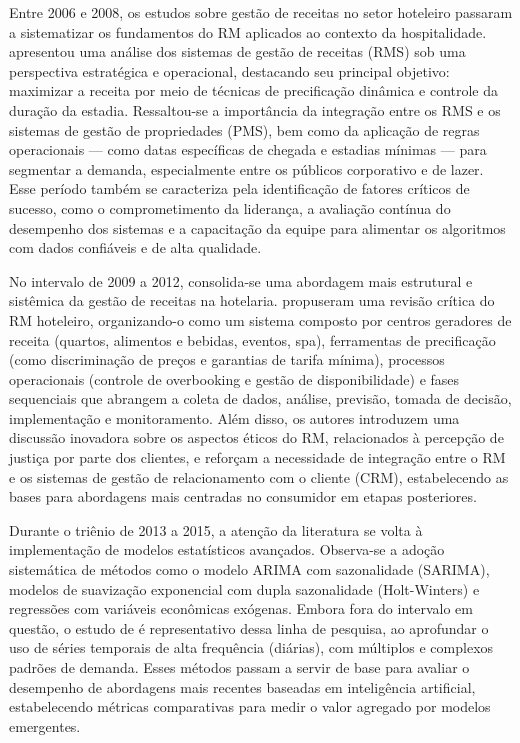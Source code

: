 Entre 2006 e 2008, os estudos sobre gestão de receitas no setor hoteleiro passaram a sistematizar os fundamentos do RM aplicados ao contexto da hospitalidade. \citep{Avinal15022006} apresentou uma análise dos sistemas de gestão de receitas (RMS) sob uma perspectiva estratégica e operacional, destacando seu principal objetivo: maximizar a receita por meio de técnicas de precificação dinâmica e controle da duração da estadia. Ressaltou-se a importância da integração entre os RMS e os sistemas de gestão de propriedades (PMS), bem como da aplicação de regras operacionais — como datas específicas de chegada e estadias mínimas — para segmentar a demanda, especialmente entre os públicos corporativo e de lazer. Esse período também se caracteriza pela identificação de fatores críticos de sucesso, como o comprometimento da liderança, a avaliação contínua do desempenho dos sistemas e a capacitação da equipe para alimentar os algoritmos com dados confiáveis e de alta qualidade.

No intervalo de 2009 a 2012, consolida-se uma abordagem mais estrutural e sistêmica da gestão de receitas na hotelaria. \citep{Ivanov2011} propuseram uma revisão crítica do RM hoteleiro, organizando-o como um sistema composto por centros geradores de receita (quartos, alimentos e bebidas, eventos, spa), ferramentas de precificação (como discriminação de preços e garantias de tarifa mínima), processos operacionais (controle de overbooking e gestão de disponibilidade) e fases sequenciais que abrangem a coleta de dados, análise, previsão, tomada de decisão, implementação e monitoramento. Além disso, os autores introduzem uma discussão inovadora sobre os aspectos éticos do RM, relacionados à percepção de justiça por parte dos clientes, e reforçam a necessidade de integração entre o RM e os sistemas de gestão de relacionamento com o cliente (CRM), estabelecendo as bases para abordagens mais centradas no consumidor em etapas posteriores.

Durante o triênio de 2013 a 2015, a atenção da literatura se volta à implementação de modelos estatísticos avançados. Observa-se a adoção sistemática de métodos como o modelo ARIMA com sazonalidade (SARIMA), modelos de suavização exponencial com dupla sazonalidade (Holt-Winters) e regressões com variáveis econômicas exógenas. Embora fora do intervalo em questão, o estudo de \citep{PEREIRA201613} é representativo dessa linha de pesquisa, ao aprofundar o uso de séries temporais de alta frequência (diárias), com múltiplos e complexos padrões de demanda. Esses métodos passam a servir de base para avaliar o desempenho de abordagens mais recentes baseadas em inteligência artificial, estabelecendo métricas comparativas para medir o valor agregado por modelos emergentes.

